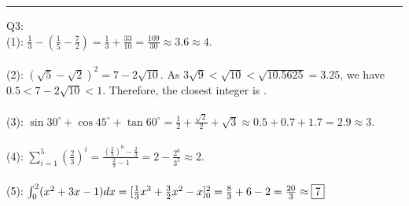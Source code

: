 \documentclass{article}
\begin{document}
\vspace{1cm}
\hrule
\vspace{1cm}

\noindent Q3:\\
(1): $\frac{1}{3}-(\frac{1}{5}-\frac{7}{2})=\frac{1}{3}+\frac{33}{10}=\frac{109}{30}\approx3.6\approx\boxed4$.\\
\\
(2): $(\sqrt5-\sqrt2)^2=7-2\sqrt{10}$. As $3\sqrt9<\sqrt{10}<\sqrt{10.5625}=3.25$, we have $0.5<7-2\sqrt{10}<1$. Therefore, the closest integer is .\\
\\
(3): $\sin30^\circ+\cos45^\circ+\tan60^\circ=\frac{1}{2}+\frac{\sqrt2}{2}+\sqrt3\approx0.5+0.7+1.7=2.9\approx\boxed3$.\\
\\
(4): $\sum\limits_{i=1}^5(\frac{2}{3})^i=\frac{(\frac{2}{3})^6-\frac{2}{3}}{\frac{2}{3}-1}=2-\frac{2^6}{3^5}\approx\boxed2$.\\
\\
(5): $\int_0^2(x^2+3x-1)dx\\
=[\frac{1}{3}x^3+\frac{3}{2}x^2-x]_0^2\\
=\frac{8}{3}+6-2\\
=\frac{20}{3}\\
\approx\boxed7$
\end{document}
